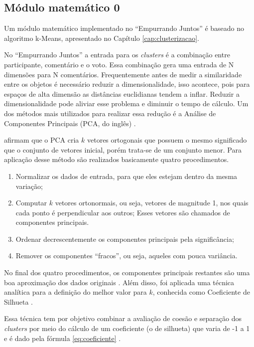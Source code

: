 \begin{apendicesenv}

\partapendices

\chapter{Módulo matemático 0}

Um módulo matemático implementado no ``Empurrando Juntos'' é baseado no algoritmo k-Means, apresentado no Capítulo \ref{cap:clusterizacao}. 

No ``Empurrando Juntos'' a entrada para os \textit{clusters} é a combinação entre participante,  
comentário e o voto. Essa combinação gera uma entrada de N dimensões para N comentários.
Frequentemente antes de medir a similaridade entre os objetos é necessário
reduzir a dimensionalidade, isso acontece, pois para espaços de alta dimensão as distâncias euclidianas
tendem a inflar. Reduzir a dimensionalidade pode aliviar esse problema e diminuir o tempo de cálculo.
Um dos métodos mais utilizados para realizar essa redução é a Análise de 
Componentes Principais (PCA, do inglês) \cite{han2011data, sklearn}.

 afirmam que o PCA cria $k$ vetores ortogonais que possuem o mesmo significado que o conjunto
de vetores inicial, porém trata-se de um conjunto menor. Para aplicação desse método são realizados basicamente quatro procedimentos.

\begin{enumerate}
 \item Normalizar os dados de entrada, para que eles estejam dentro da mesma variação;
 \item Computar $k$ vetores ortonormais, ou seja, vetores de magnitude 1, nos quais cada ponto é perpendicular aos outros;
  \subitem Esses vetores são chamados de componentes principais.
 \item Ordenar decrescentemente os componentes principais pela significância;
 \item Remover os componentes ``fracos'', ou seja, aqueles com pouca variância.
\end{enumerate}

No final dos quatro procedimentos, os componentes principais restantes são uma boa aproximação dos dados originais \cite{han2011data}.
Além disso, foi aplicada uma técnica analítica para a definição do melhor valor para $k$, conhecida como Coeficiente de Silhueta \cite{sklearn}.

Essa técnica tem por objetivo combinar a avaliação de coesão e separação dos \textit{clusters} por meio do cálculo de um coeficiente (o de silhueta) que 
varia de -1 a 1 e é dado pela fórmula \ref{eq:coeficiente} \cite{tan2013data}.


\end{apendicesenv}
